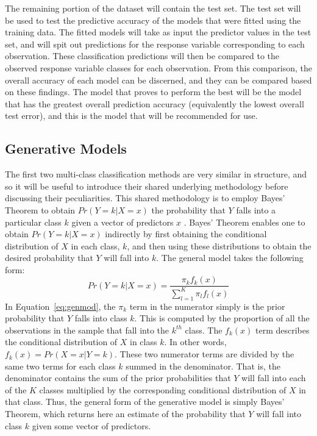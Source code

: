 \documentclass[12pt]{article}
\begin{document}
The remaining portion of the dataset will contain the test set.  The test set will be used 
to test the predictive accuracy of the models that were fitted using the training data.  
The fitted models will take as input the predictor values in the test set, and will spit 
out predictions for the response variable corresponding to each observation.  These 
classification predictions will then be compared to the observed response variable classes 
for each observation.  From this comparison, the overall accuracy of each model can be 
discerned, and they can be compared based on these findings.  The model that proves to 
perform the best will be the model that has the greatest overall prediction accuracy 
(equivalently the lowest overall test error), and this is the model that will be recommended 
for use. 

\subsection{Generative Models}
\label{sec:gm}

The first two multi-class classification methods are very similar in structure, and so it 
will be useful to introduce their shared underlying methodology before discussing their 
peculiarities.  This shared methodology is to employ Bayes' Theorem to obtain 
$Pr( Y = k | X = x)$ the probability that $Y$ falls into a particular class $k$ given a 
vector of predictors $x$ \citep{james2021introduction}.  Bayes' Theorem enables one to 
obtain $Pr( Y = k | X = x)$ indirectly by first obtaining the conditional distribution 
of $X$ in each class, $k$, and then using these distributions to obtain the desired 
probability that $Y$ will fall into $k$.  The general model takes the following form:
\begin{equation}
  \label{eq:genmod}
  Pr(Y = k | X = x) =
  \frac{\pi_k f_k(x)} {\sum_{l = 1} ^ {K} \pi_l f_l(x)}
\end{equation}
In Equation~\eqref{eq:genmod}, the $\pi_k$ term in the numerator simply is the prior 
probability that $Y$ falls into class $k$.  This is computed by the proportion of all 
the observations in the sample that fall into the $k ^ {th}$ class.  The $f_k(x)$ term 
describes the conditional distribution of $X$ in class $k$.  In other words, 
$f_k(x) = Pr(X = x | Y = k)$.  These two numerator terms are divided by the same two 
terms for each class $k$ summed in the denominator.  That is, the denominator contains 
the sum of the prior probabilities that $Y$ will fall into each of the $K$ classes 
multiplied by the corresponding conditional distribution of $X$ in that class.  Thus, 
the general form of the generative model is simply Bayes' Theorem, which returns here 
an estimate of the probability that $Y$ will fall into class $k$ given some vector of 
predictors.  
\end{document}
